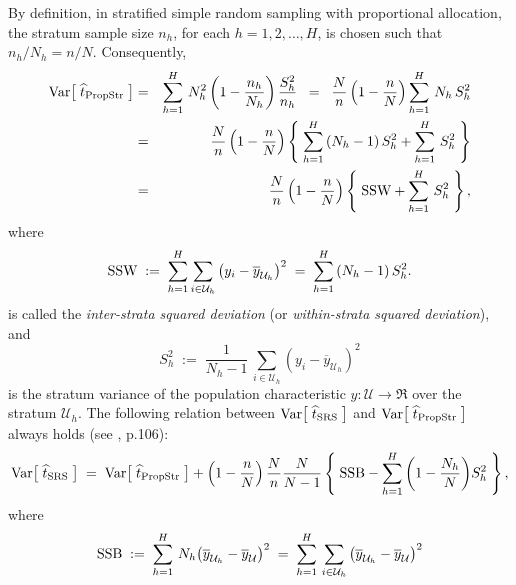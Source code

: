 \documentclass{article}
\begin{document}
By definition, in stratified simple random sampling with proportional allocation, the stratum sample size $n_{h}$, for each $h=1,2,\ldots,H$, is chosen such that $n_{h}/N_{h} = n/N$.  Consequently,
\begin{eqnarray*}
            \textnormal{Var}\!\left[\;\widehat{t}_{\textnormal{PropStr}}\;\right]
    &=&  \sum^{H}_{h=1}\, N_{h}^{2}\left(1-\dfrac{n_{h}}{N_{h}}\right)\dfrac{S^{2}_{h}}{n_{h}}
    \;\;=\;\;  \dfrac{N}{n}\left(1-\dfrac{n}{N}\right) \sum^{H}_{h=1}\, N_{h}\,S^{2}_{h} \\
    &=&  \dfrac{N}{n}\left(1-\dfrac{n}{N}\right) \left\{\;\sum^{H}_{h=1}\, (N_{h}-1)\,S^{2}_{h} + \sum^{H}_{h=1}\,S^{2}_{h}\;\right\} \\
    &=&  \dfrac{N}{n}\left(1-\dfrac{n}{N}\right) \left\{\; \textnormal{SSW} + \sum^{H}_{h=1}\,S^{2}_{h}\;\right\},
\end{eqnarray*}
where
\begin{equation*}
   \textnormal{SSW} \; := \;
   \sum^{H}_{h=1}\sum_{i\in\mathcal{U}_{h}}\left(y_{i}-\overline{y}_{\mathcal{U}_{h}}\right)^{2}
   \; = \;
   \sum^{H}_{h=1}\,(N_{h}-1)\,S^{2}_{h}.
\end{equation*}
is called the \emph{inter-strata squared deviation} (or \emph{within-strata squared deviation}), and
\begin{equation*}
    S^{2}_{h} \; := \; \dfrac{1}{N_{h}-1}\,\sum_{i\in\mathcal{U}_{h}}\left(y_{i}-\overline{y}_{\mathcal{U}_{h}}\right)^{2}
\end{equation*}
is the stratum variance of the population characteristic $y : \mathcal{U} \longrightarrow \Re$ over the stratum $\mathcal{U}_{h}$.  The following relation between $\textnormal{Var}\!\left[\;\widehat{t}_{\textnormal{SRS}}\;\right]$ and $\textnormal{Var}\!\left[\;\widehat{t}_{\textnormal{PropStr}}\;\right]$ always holds (see \cite{Lohr1999}, p.106):
\begin{equation*}
\textnormal{Var}\!\left[\;\widehat{t}_{\textnormal{SRS}}\;\right]
\;=\;
\textnormal{Var}\!\left[\;\widehat{t}_{\textnormal{PropStr}}\;\right] + 
\left(1-\dfrac{n}{N}\right)\dfrac{N}{n}\dfrac{N}{N-1}
\left\{\;\textnormal{SSB} - \sum_{h=1}^{H}\left(1-\dfrac{N_{h}}{N}\right)\!S^{2}_{h}\;\right\},
\end{equation*}
where
\begin{equation*}
    \textnormal{SSB} \; := \; \sum^{H}_{h=1}\,N_{h}\!\left(\overline{y}_{\mathcal{U}_{h}} - \overline{y}_{\mathcal{U}}\right)^{2}
    \; = \; \sum^{H}_{h=1}\,\sum_{i\in\mathcal{U}_{h}}\left(\overline{y}_{\mathcal{U}_{h}} - \overline{y}_{\mathcal{U}}\right)^{2}
\end{equation*}
\end{document}
